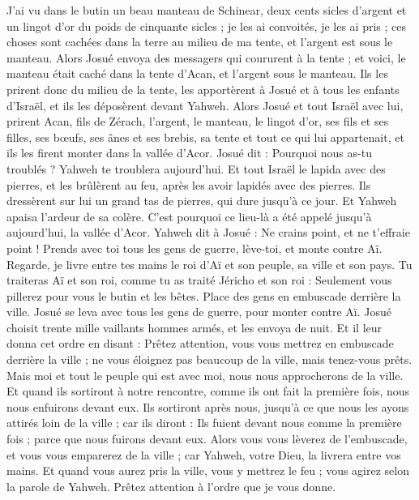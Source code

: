 \begin{multicols}{2}
J’ai vu dans le butin un beau manteau de Schinear, deux cents sicles d’argent et un lingot d’or du poids de cinquante sicles ; je les ai convoités, je les ai pris ; ces choses sont cachées dans la terre au milieu de ma tente, et l’argent est sous le manteau.
Alors Josué envoya des messagers qui coururent à la tente ; et voici, le manteau était caché dans la tente d’Acan, et l’argent sous le manteau.
Ils les prirent donc du milieu de la tente, les apportèrent à Josué et à tous les enfants d’Israël, et ils les déposèrent devant Yahweh.
Alors Josué et tout Israël avec lui, prirent Acan, fils de Zérach, l’argent, le manteau, le lingot d’or, ses fils et ses filles, ses bœufs, ses ânes et ses brebis, sa tente et tout ce qui lui appartenait, et ils les firent monter dans la vallée d’Acor.
Josué dit : Pourquoi nous as-tu troublés ? Yahweh te troublera aujourd’hui. Et tout Israël le lapida avec des pierres, et les brûlèrent au feu, après les avoir lapidés avec des pierres.
Ils dressèrent sur lui un grand tas de pierres, qui dure jusqu’à ce jour. Et Yahweh apaisa l’ardeur de sa colère. C’est pourquoi ce lieu-là a été appelé jusqu’à aujourd’hui, la vallée d’Acor.
\VerseOne{}Yahweh dit à Josué : Ne crains point, et ne t’effraie point ! Prends avec toi tous les gens de guerre, lève-toi, et monte contre Aï. Regarde, je livre entre tes mains le roi d’Aï et son peuple, sa ville et son pays.
Tu traiteras Aï et son roi, comme tu as traité Jéricho et son roi : Seulement vous pillerez pour vous le butin et les bêtes. Place des gens en embuscade derrière la ville.
Josué se leva avec tous les gens de guerre, pour monter contre Aï. Josué choisit trente mille vaillants hommes armés, et les envoya de nuit.
Et il leur donna cet ordre en disant : Prêtez attention, vous vous mettrez en embuscade derrière la ville ; ne vous éloignez pas beaucoup de la ville, mais tenez-vous prêts.
Mais moi et tout le peuple qui est avec moi, nous nous approcherons de la ville. Et quand ils sortiront à notre rencontre, comme ils ont fait la première fois, nous nous enfuirons devant eux.
Ils sortiront après nous, jusqu’à ce que nous les ayons attirés loin de la ville ; car ils diront : Ils fuient devant nous comme la première fois ; parce que nous fuirons devant eux.
Alors vous vous lèverez de l’embuscade, et vous vous emparerez de la ville ; car Yahweh, votre Dieu, la livrera entre vos mains.
Et quand vous aurez pris la ville, vous y mettrez le feu ; vous agirez selon la parole de Yahweh. Prêtez attention à l’ordre que je vous donne.

\end{multicols}

